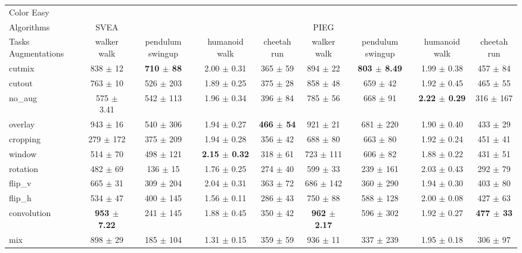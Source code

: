 \begin{tabular}{lcccccccc}
Color Easy & & & & & & & & \\
Algorithms & SVEA & & & & PIEG & & & \\
Tasks Augmentations & walker walk & pendulum swingup & humanoid walk & cheetah run & walker walk & pendulum swingup & humanoid walk & cheetah run \\
cutmix          & 838 $\pm$ 12 & \textbf{710 $\pm$ 88} & 2.00 $\pm$ 0.31 & 365 $\pm$ 59 & 894 $\pm$ 22 & \textbf{803 $\pm$ 8.49} & 1.99 $\pm$ 0.38 & 457 $\pm$ 84 \\
cutout          & 763 $\pm$ 10 & 526 $\pm$ 203 & 1.89 $\pm$ 0.25 & 375 $\pm$ 28 & 858 $\pm$ 48 & 659 $\pm$ 42 & 1.92 $\pm$ 0.45 & 465 $\pm$ 55 \\
no\_aug         & 575 $\pm$ 3.41 & 542 $\pm$ 113 & 1.96 $\pm$ 0.34 & 396 $\pm$ 84 & 785 $\pm$ 56 & 668 $\pm$ 91 & \textbf{2.22 $\pm$ 0.29} & 316 $\pm$ 167 \\
overlay         & 943 $\pm$ 16 & 540 $\pm$ 306 & 1.94 $\pm$ 0.27 & \textbf{466 $\pm$ 54} & 921 $\pm$ 21 & 681 $\pm$ 220 & 1.90 $\pm$ 0.40 & 433 $\pm$ 29 \\
cropping        & 279 $\pm$ 172 & 375 $\pm$ 209 & 1.94 $\pm$ 0.28 & 356 $\pm$ 42 & 688 $\pm$ 80 & 663 $\pm$ 80 & 1.92 $\pm$ 0.24 & 451 $\pm$ 41 \\
window          & 514 $\pm$ 70 & 498 $\pm$ 121 & \textbf{2.15 $\pm$ 0.32} & 318 $\pm$ 61 & 723 $\pm$ 111 & 606 $\pm$ 82 & 1.88 $\pm$ 0.22 & 431 $\pm$ 51 \\
rotation        & 482 $\pm$ 69 & 136 $\pm$ 15 & 1.76 $\pm$ 0.25 & 274 $\pm$ 40 & 599 $\pm$ 33 & 239 $\pm$ 161 & 2.03 $\pm$ 0.43 & 292 $\pm$ 79 \\
flip\_v         & 665 $\pm$ 31 & 309 $\pm$ 204 & 2.04 $\pm$ 0.31 & 363 $\pm$ 72 & 686 $\pm$ 142 & 360 $\pm$ 290 & 1.94 $\pm$ 0.30 & 403 $\pm$ 80 \\
flip\_h         & 534 $\pm$ 47 & 400 $\pm$ 145 & 1.56 $\pm$ 0.11 & 286 $\pm$ 43 & 750 $\pm$ 88 & 588 $\pm$ 128 & 2.00 $\pm$ 0.08 & 427 $\pm$ 63 \\
convolution     & \textbf{953 $\pm$ 7.22} & 241 $\pm$ 145 & 1.88 $\pm$ 0.45 & 350 $\pm$ 42 & \textbf{962 $\pm$ 2.17} & 596 $\pm$ 302 & 1.92 $\pm$ 0.27 & \textbf{477 $\pm$ 33} \\
mix             & 898 $\pm$ 29 & 185 $\pm$ 104 & 1.31 $\pm$ 0.15 & 359 $\pm$ 59 & 936 $\pm$ 11 & 337 $\pm$ 239 & 1.95 $\pm$ 0.18 & 306 $\pm$ 97 \\
\end{tabular}